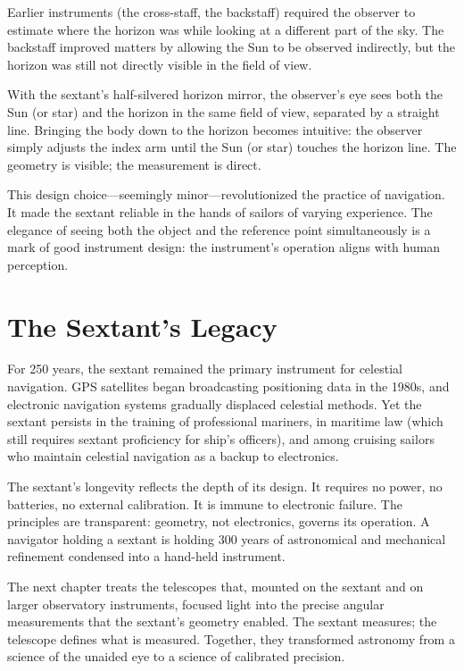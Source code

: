 Earlier instruments (the cross-staff, the backstaff) required the observer to estimate where the horizon was while looking at a different part of the sky. The backstaff improved matters by allowing the Sun to be observed indirectly, but the horizon was still not directly visible in the field of view.

With the sextant's half-silvered horizon mirror, the observer's eye sees both the Sun (or star) and the horizon in the same field of view, separated by a straight line. Bringing the body down to the horizon becomes intuitive: the observer simply adjusts the index arm until the Sun (or star) touches the horizon line. The geometry is visible; the measurement is direct.

This design choice—seemingly minor—revolutionized the practice of navigation. It made the sextant reliable in the hands of sailors of varying experience. The elegance of seeing both the object and the reference point simultaneously is a mark of good instrument design: the instrument's operation aligns with human perception.

\section{The Sextant's Legacy}

For 250 years, the sextant remained the primary instrument for celestial navigation. GPS satellites began broadcasting positioning data in the 1980s, and electronic navigation systems gradually displaced celestial methods. Yet the sextant persists in the training of professional mariners, in maritime law (which still requires sextant proficiency for ship's officers), and among cruising sailors who maintain celestial navigation as a backup to electronics.

The sextant's longevity reflects the depth of its design. It requires no power, no batteries, no external calibration. It is immune to electronic failure. The principles are transparent: geometry, not electronics, governs its operation. A navigator holding a sextant is holding 300 years of astronomical and mechanical refinement condensed into a hand-held instrument.

The next chapter treats the telescopes that, mounted on the sextant and on larger observatory instruments, focused light into the precise angular measurements that the sextant's geometry enabled. The sextant measures; the telescope defines what is measured. Together, they transformed astronomy from a science of the unaided eye to a science of calibrated precision.

